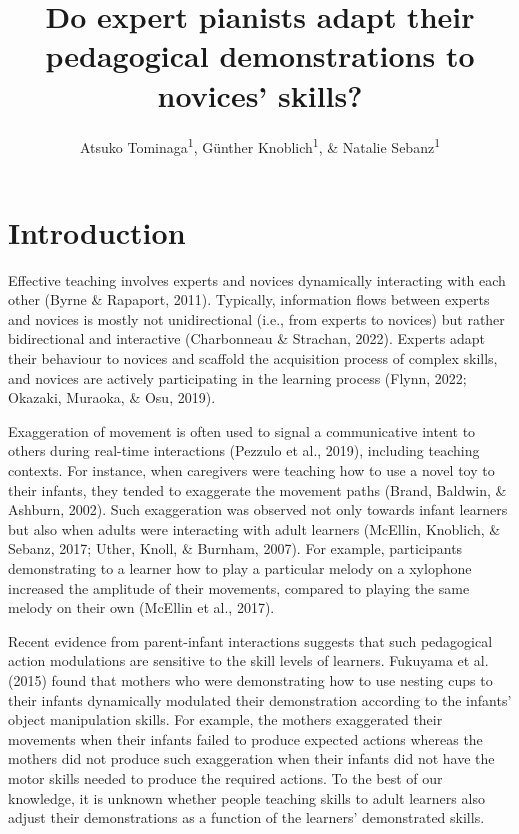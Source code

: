 \documentclass[
  man,floatsintext]{apa6}
\title{Do expert pianists adapt their pedagogical demonstrations to novices' skills?}
\author{Atsuko Tominaga\textsuperscript{1}, Günther Knoblich\textsuperscript{1}, \& Natalie Sebanz\textsuperscript{1}}
\date{}
\affiliation{\vspace{0.5cm}\textsuperscript{1} Department of Cognitive Science, Central European University}
\begin{document}
\maketitle

\hypertarget{introduction}{%
\section{Introduction}\label{introduction}}

Effective teaching involves experts and novices dynamically interacting with each other (Byrne \& Rapaport, 2011). Typically, information flows between experts and novices is mostly not unidirectional (i.e., from experts to novices) but rather bidirectional and interactive (Charbonneau \& Strachan, 2022). Experts adapt their behaviour to novices and scaffold the acquisition process of complex skills, and novices are actively participating in the learning process (Flynn, 2022; Okazaki, Muraoka, \& Osu, 2019).

Exaggeration of movement is often used to signal a communicative intent to others during real-time interactions (Pezzulo et al., 2019), including teaching contexts. For instance, when caregivers were teaching how to use a novel toy to their infants, they tended to exaggerate the movement paths (Brand, Baldwin, \& Ashburn, 2002). Such exaggeration was observed not only towards infant learners but also when adults were interacting with adult learners (McEllin, Knoblich, \& Sebanz, 2017; Uther, Knoll, \& Burnham, 2007). For example, participants demonstrating to a learner how to play a particular melody on a xylophone increased the amplitude of their movements, compared to playing the same melody on their own (McEllin et al., 2017).

Recent evidence from parent-infant interactions suggests that such pedagogical action modulations are sensitive to the skill levels of learners. Fukuyama et al. (2015) found that mothers who were demonstrating how to use nesting cups to their infants dynamically modulated their demonstration according to the infants' object manipulation skills. For example, the mothers exaggerated their movements when their infants failed to produce expected actions whereas the mothers did not produce such exaggeration when their infants did not have the motor skills needed to produce the required actions. To the best of our knowledge, it is unknown whether people teaching skills to adult learners also adjust their demonstrations as a function of the learners' demonstrated skills.
\end{document}
